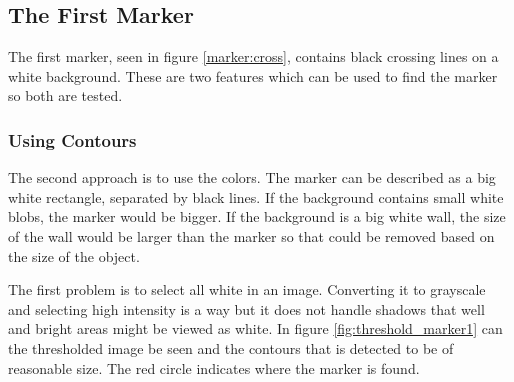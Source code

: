 \subsection{The First Marker}
The first marker, seen in figure \ref{marker:cross}, contains black crossing lines on a white background.
These are two features which can be used to find the marker so both are tested.



\subsubsection{Using Contours}
The second approach is to use the colors. 
The marker can be described as a big white rectangle, separated by black lines.
If the background contains small white blobs, the marker would be bigger.
If the background is a big white wall, the size of the wall would be larger than the marker so that could be removed based on the size of the object.

The first problem is to select all white in an image.
Converting it to grayscale and selecting high intensity is a way but it does not handle shadows that well and bright areas might be viewed as white.
In figure \ref{fig:threshold_marker1} can the thresholded image be seen and the contours that is detected to be of reasonable size.
The red circle indicates where the marker is found.

